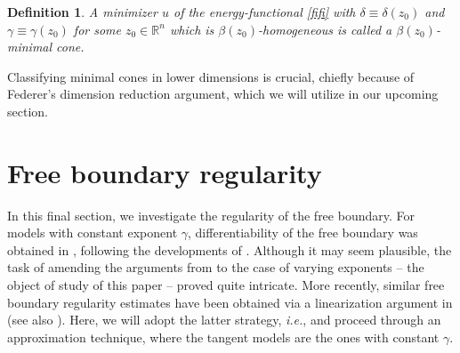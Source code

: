 \documentclass[reqno,11pt]{amsart}
\newtheorem{definition}{Definition}[section]
\newcommand{\1}{\mathds{1}}
\numberwithin{equation}{section}
\begin{document}
\begin{definition}\label{def: min cone}
A minimizer $u$ of the energy-functional \eqref{fifi} with $\delta \equiv \delta(z_0)$ and $\gamma \equiv \gamma(z_0)$ for some $z_0 \in \mathbb{R}^n$ which is $\beta(z_0)$-homogeneous is called a $\beta(z_0)$-minimal cone. 
\end{definition}

Classifying minimal cones in lower dimensions is crucial, chiefly because of Federer's dimension reduction argument, which we will utilize in our upcoming section.

\section{Free boundary regularity}\label{sct FB reg}

In this final section, we investigate the regularity of the free boundary. For models with constant exponent $\gamma$, differentiability of the free boundary was obtained in \cite{AP}, following the developments of \cite{AC}. Although it may seem plausible, the task of amending the arguments from \cite{AC, AP} to the case of varying exponents -- the object of study of this paper -- proved quite intricate. More recently, similar free boundary regularity estimates have been obtained via a linearization argument in \cite{DSS} (see also \cite{DS}). Here, we will adopt the latter strategy, \textit{i.e.}, and proceed through an approximation technique, where the tangent models are the ones with constant $\gamma$.
\end{document}
